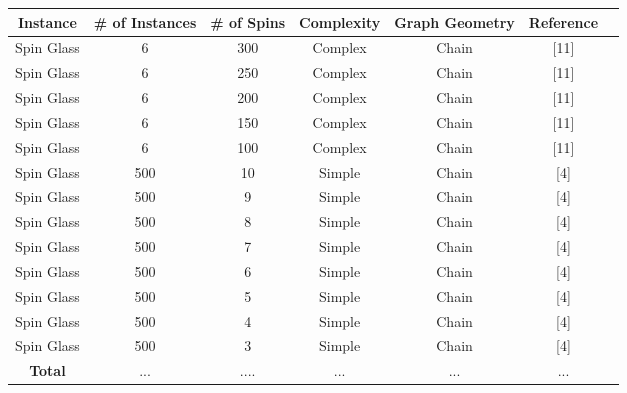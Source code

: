 \documentclass{standalone}
\begin{document}
\begin{tabular}{ |c|c|c|c|c|c|c| } 
    \hline
    \textbf{Instance} & \textbf{\# of Instances} & \textbf{\# of Spins} & \textbf{Complexity} & \textbf{Graph Geometry} & \textbf{Reference}\\ 
    \hline
    Spin Glass & 6 & 300 & Complex & Chain & [11] \\
    Spin Glass & 6 & 250 & Complex & Chain & [11] \\
    Spin Glass & 6 & 200 & Complex & Chain & [11] \\
    Spin Glass & 6 & 150 & Complex & Chain & [11] \\
    Spin Glass & 6 & 100 & Complex & Chain & [11] \\
    Spin Glass & 500 & 10 & Simple & Chain & [4] \\
    Spin Glass & 500 & 9 & Simple & Chain & [4] \\
    Spin Glass & 500 & 8 & Simple & Chain & [4] \\
    Spin Glass & 500 & 7 & Simple & Chain & [4] \\
    Spin Glass & 500 & 6 & Simple & Chain & [4] \\
    Spin Glass & 500 & 5 & Simple & Chain & [4] \\
    Spin Glass & 500 & 4 & Simple & Chain & [4] \\
    Spin Glass & 500 & 3 & Simple & Chain & [4] \\
    \hline
    \textbf{Total} & ... & .... & ... & ... & ... \\
    \hline
\end{tabular}
\end{document}

